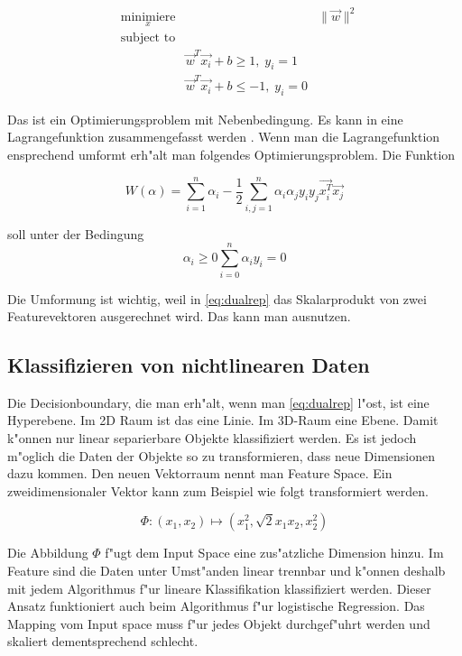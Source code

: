 \documentclass[12pt,a4paper,twoside]{article}
\begin{document}
 \begin{equation*}
\begin{aligned}
& \underset{x}{\text{minimiere}}
& & \lVert \vec w \rVert^2 \\
& \text{subject to}\\
& & \vec{w}^T \vec{x_i} + b \geq 1, \; y_i = 1 \\
& & \vec{w}^T \vec{x_i} + b \leq -1, \;  y_i = 0
\end{aligned}
\end{equation*}

Das ist ein Optimierungsproblem mit Nebenbedingung. Es kann in eine Lagrangefunktion zusammengefasst werden \cite{cristianini}. Wenn man die Lagrangefunktion ensprechend umformt erh"alt man folgendes Optimierungsproblem. Die Funktion

\begin{equation}
  \label{eq:dualrep}
W(\alpha) = \sum_{i=1}^n \alpha_i - \frac{1}{2} \sum_{i,j = 1}^n \alpha_i \alpha_j y_i y_j \vec{x_i^T} \vec{x_j}  
\end{equation}

soll unter der Bedingung
 \[
\alpha_i \geq 0
\sum_{i=0}^n \alpha_i y_i = 0
\]

Die Umformung ist wichtig, weil in \ref{eq:dualrep} das Skalarprodukt von zwei Featurevektoren ausgerechnet wird. Das kann man ausnutzen.

\subsection{Klassifizieren von nichtlinearen Daten}
\label{sec:nonlinear}

Die Decisionboundary, die man erh"alt, wenn man \ref{eq:dualrep} l"ost, ist eine Hyperebene. Im 2D Raum ist das eine Linie. Im 3D-Raum eine Ebene. Damit k"onnen nur linear separierbare Objekte klassifiziert werden. Es ist jedoch m"oglich die Daten der Objekte so zu transformieren, dass neue Dimensionen dazu kommen. Den neuen Vektorraum nennt man Feature Space. Ein zweidimensionaler Vektor kann zum Beispiel wie folgt transformiert werden.

\begin{equation}
  \label{eq:polynomial}
\Phi: (x_1, x_2) \mapsto (x_1^2, \sqrt{2} x_1 x_2, x_2^2)
\end{equation}

Die Abbildung $\Phi$ f"ugt dem Input Space eine zus"atzliche Dimension hinzu. Im Feature sind die Daten unter Umst"anden linear trennbar und k"onnen deshalb mit jedem Algorithmus f"ur lineare Klassifikation klassifiziert werden. Dieser Ansatz funktioniert auch beim Algorithmus f"ur logistische Regression. Das Mapping vom Input space muss f"ur jedes Objekt durchgef"uhrt werden und skaliert dementsprechend schlecht. 
\end{document}
